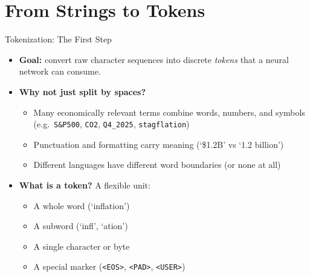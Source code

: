 \section{From Strings to Tokens}

\begin{frame}{Tokenization: The First Step}
\begin{itemize}
\item \textbf{Goal:} convert raw character sequences into discrete \emph{tokens} that a neural network can consume.

\medskip
\item \textbf{Why not just split by spaces?}
\begin{itemize}
    \item Many economically relevant terms combine words, numbers, and symbols (e.g.\ \texttt{S\&P500}, \texttt{CO2}, \texttt{Q4\_2025}, \texttt{stagflation})
    \item Punctuation and formatting carry meaning (`\$1.2B' vs `1.2 billion')
    \item Different languages have different word boundaries (or none at all)
\end{itemize}

\medskip
\item \textbf{What is a token?} A flexible unit:
\begin{itemize}
    \item A whole word (`inflation')
    \item A subword (`infl', `ation')
    \item A single character or byte
    \item A special marker (\texttt{<EOS>}, \texttt{<PAD>}, \texttt{<USER>})
\end{itemize}
\end{itemize}
\end{frame}

